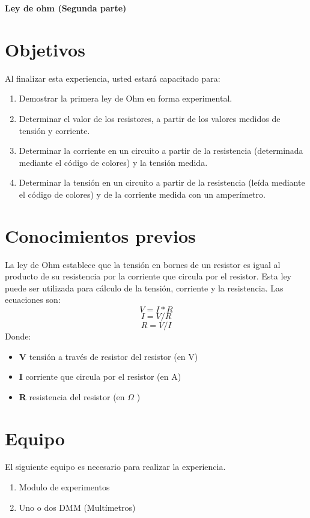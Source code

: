\thispagestyle{fancy}
\begin{center}
	\LARGE{\textbf{Ley de ohm (Segunda parte)}}
\end{center}
\section{Objetivos}
Al finalizar esta experiencia, usted estará capacitado para:
\begin{enumerate}
	\item Demostrar la primera ley de Ohm en forma experimental.
	\item Determinar el valor de los resistores, a partir de los valores medidos de tensión y corriente.
	\item Determinar la corriente en un circuito a partir de la resistencia (determinada mediante el código de colores) y la tensión medida.
	\item Determinar la tensión en un circuito a partir de la resistencia (leída mediante el código de colores) y de la corriente medida con un amperímetro.
\end{enumerate}

\section{Conocimientos previos}
La ley de Ohm establece que la tensión en bornes de un resistor es igual al producto de su resistencia por la corriente que circula por el resistor.
Esta ley puede ser utilizada para cálculo de la tensión, corriente y la resistencia. 
Las ecuaciones son:
\begin{equation*}
	V=I*R 
\end{equation*}
\begin{equation*}
	I=V/R
\end{equation*}
\begin{equation*}
	R=V/I
\end{equation*}
Donde:
\begin{itemize}
	\item \textbf{V} tensión a través de resistor del resistor (en V)
	\item \textbf{I} corriente que circula por el resistor (en A) 
	\item \textbf{R} resistencia del resistor (en $\Omega $ )
\end{itemize}
\section{Equipo}
El siguiente equipo es necesario para realizar la experiencia.
\begin{enumerate}
	\item Modulo de experimentos
	\item Uno o dos DMM (Multímetros)
\end{enumerate} 
